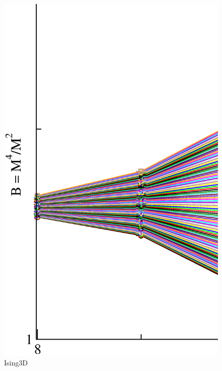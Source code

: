 \begin{figure}[!htpb]
  \centering
  \includegraphics[width=15cm]{./plots/Ising3D/Ising3D_BinderCumulant_vs_L.eps}
  \caption{Ising3D}
\end{figure}

